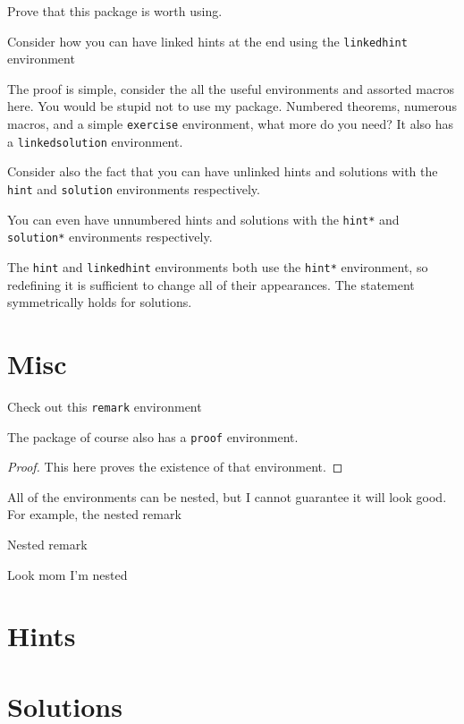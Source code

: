\documentclass{article}
\begin{document}
\begin{exercise}
Prove that this package is worth using.
\end{exercise}

\begin{linkedhint}
Consider how you can have linked hints at the end using the \texttt{linkedhint} environment
\end{linkedhint}
\begin{linkedsolution}
The proof is simple, consider the all the useful environments and assorted macros here.
You would be stupid not to use my package.
Numbered theorems, numerous macros, and a simple \texttt{exercise} environment, what more do you need?
It also has a \texttt{linkedsolution} environment.
\end{linkedsolution}

\begin{hint}
Consider also the fact that you can have unlinked hints and solutions with the \texttt{hint} and \texttt{solution} environments respectively.
\end{hint}

\begin{hint*}
You can even have unnumbered hints and solutions with the \texttt{hint*} and \texttt{solution*} environments respectively.
\end{hint*}

The \texttt{hint} and \texttt{linkedhint} environments both use the \texttt{hint*} environment, so redefining it is sufficient to change all of their appearances.
The statement symmetrically holds for solutions.

\section{Misc}

\begin{remark} Check out this \texttt{remark} environment\end{remark}

The package of course also has a \texttt{proof} environment.

\begin{proof}
This here proves the existence of that environment.
\end{proof}

All of the environments can be nested, but I cannot guarantee it will look good.
For example, the nested remark

\begin{remark}
Nested remark
\begin{remark}
Look mom I'm nested
\end{remark}
\end{remark}

\section{Hints}

\printhints

\section{Solutions}

\printsols
\end{document}
